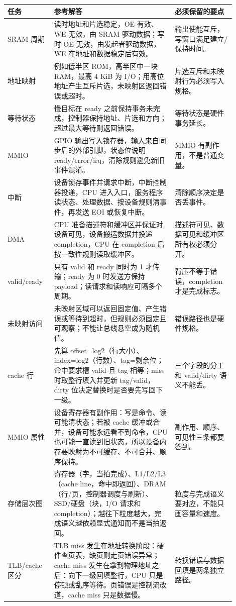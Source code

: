 \begin{longtable}{L{0.18\linewidth}L{0.48\linewidth}L{0.24\linewidth}}
\toprule
任务 & 参考解答 & 必须保留的要点 \\
\midrule
SRAM 周期 & 读时地址和片选稳定，OE 有效、WE 无效，由 SRAM 驱动数据；写时 OE 无效，由发起者驱动数据，WE 在地址和数据稳定后有效。 & 输出使能互斥，写窗口满足建立/保持时间。 \\
地址映射 & 例如低半区 ROM，高半区中一块 RAM，最高 4 KiB 为 I/O；用高位地址产生互斥片选，未映射区返回错误或超时。 & 片选互斥和未映射行为必须写入规格。 \\
等待状态 & 慢目标在 ready 之前保持事务未完成，控制器保持地址、片选和方向；超过最大等待则返回错误。 & 等待状态是硬件事务延长。 \\
MMIO & GPIO 输出写入锁存器，输入来自同步后的外部引脚，状态位说明 ready/error/irq，清除规则避免新旧事件混淆。 & MMIO 有副作用，不是普通变量。 \\
中断 & 设备锁存事件并请求中断，中断控制器投递，CPU 进入入口，服务程序读状态、处理数据、按设备规则清事件，再发送 EOI 或恢复中断。 & 清除顺序决定是否丢事件。 \\
DMA & CPU 准备描述符和缓冲区并保证对设备可见，设备搬运数据并投递 completion，CPU 在 completion 后按一致性规则读取缓冲区。 & 描述符可见、数据可见和缓冲区所有权必须分开。 \\
valid/ready & 只有 valid 和 ready 同时为 1 才传输；ready 为 0 时发送方保持 payload；读请求和读响应可隔多个周期。 & 背压不等于错误，completion 才是完成标志。 \\
未映射访问 & 未映射区域可以返回固定值、产生错误或等待到超时，但规则必须固定且可观察；不能让总线悬空成为随机值。 & 错误路径也是硬件规格。 \\
cache 行 & 先算 offset=log2（行大小）、index=log2（行数）、tag=剩余位；命中要求槽 valid 且 tag 相等；miss 时取整行填入并更新 tag/valid，dirty 位决定替换时是否要先写回下一级。 & 三个字段的分工和 valid/dirty 语义不能丢。 \\
MMIO 属性 & 设备寄存器有副作用：写是命令、读可能清状态；若被 cache 缓冲或合并，设备可能永远看不到命令，CPU 也可能一直读到旧状态，所以设备内存要映射为不可缓存、不可合并、顺序保持。 & 副作用、顺序、可见性三条都要答到。 \\
存储层次图 & 寄存器（字，当拍完成）、L1/L2/L3（cache line，命中即返回）、DRAM（行/页，控制器调度与刷新）、SSD/硬盘（块，I/O 请求和 completion）；越往下粒度越大，完成语义越依赖显式通知而不是当拍返回。 & 粒度与完成语义要对应，不能只画容量和速度。 \\
TLB/cache 区分 & TLB miss 发生在地址转换阶段：硬件查页表，缺页则走页错误异常；cache miss 发生在拿到物理地址之后：向下一级回填整行，CPU 只是停顿或乱序等待。页错误是控制流改道，cache miss 只是数据慢。 & 转换错误与数据回填是两条独立路径。 \\

\end{longtable}
